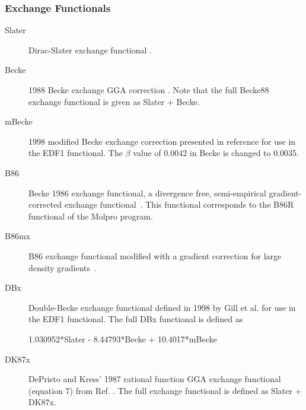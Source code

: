 \subsubsection{Exchange Functionals}
\providecommand\exfn[1]{#1}
\begin{description}

\item[Slater] Dirac-Slater exchange functional
\cite{dft:hohenberg,dft:kohn,dft:slater}.

\item[Becke] 1988 Becke exchange GGA correction \cite{dft:becke88}. 
  Note that the full Becke88 exchange functional is given as
  \exfn{Slater} + \exfn{Becke}.

\item[mBecke] 1998 modified \exfn{Becke} exchange correction presented in reference
  \cite{dft:edf1} for use in the EDF1 functional. The $\beta$ value
  of 0.0042 in \exfn{Becke} is changed to 0.0035.

\item[B86] Becke 1986 exchange functional, a divergence free, semi-empirical 
    gradient-corrected exchange functional~\cite{dft:b86,dft:b86r}. This 
    functional corresponds to the B86R functional of the Molpro program.

\item[B86mx] B86 exchange functional modified with a gradient correction 
  for large density gradients~\cite{dft:b86mgc}.

\item[DBx] Double-Becke exchange functional defined in 1998 by 
  Gill et al.\cite{dft:edf1,dft:edf2} for use in the EDF1 functional. 
  The full DBx functional is defined as

  1.030952*\exfn{Slater} - 8.44793*\exfn{Becke} + 10.4017*\exfn{mBecke}

\item[DK87x] DePristo and Kress' 1987 rational function GGA exchange functional 
  (equation 7) from Ref. \cite{dft:dk87}. The full exchange
  functional is defined as \exfn{Slater} + \exfn{DK87x}.

%


\end{description}
